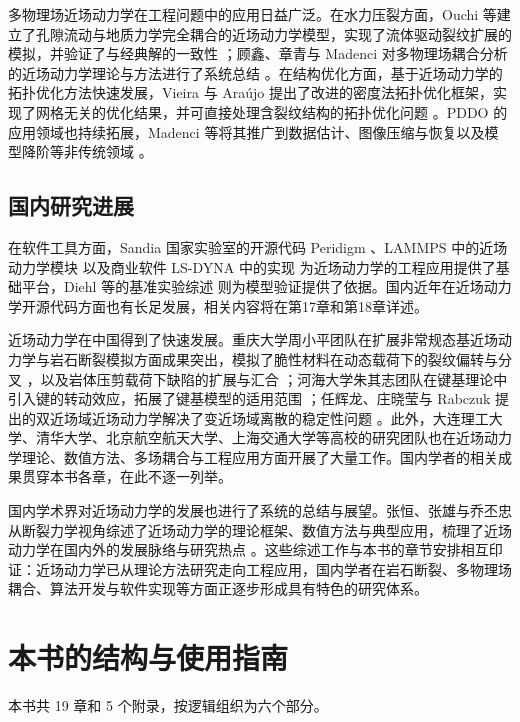 多物理场近场动力学在工程问题中的应用日益广泛。在水力压裂方面，Ouchi 等建立了孔隙流动与地质力学完全耦合的近场动力学模型，实现了流体驱动裂纹扩展的模拟，并验证了与经典解的一致性 \cite{Ouchi2015}；顾鑫、章青与 Madenci 对多物理场耦合分析的近场动力学理论与方法进行了系统总结 \cite{GuZhang2019}。在结构优化方面，基于近场动力学的拓扑优化方法快速发展，Vieira 与 Ara\'ujo 提出了改进的密度法拓扑优化框架，实现了网格无关的优化结果，并可直接处理含裂纹结构的拓扑优化问题 \cite{Vieira2024}。PDDO 的应用领域也持续拓展，Madenci 等将其推广到数据估计、图像压缩与恢复以及模型降阶等非传统领域 \cite{Madenci2022}。

\subsection{国内研究进展}

在软件工具方面，Sandia 国家实验室的开源代码 Peridigm \cite{Peridigm2012}、LAMMPS 中的近场动力学模块 \cite{Parks2008} 以及商业软件 LS-DYNA 中的实现 \cite{WuRen2015} 为近场动力学的工程应用提供了基础平台，Diehl 等的基准实验综述 \cite{Diehl2019} 则为模型验证提供了依据。国内近年在近场动力学开源代码方面也有长足发展，相关内容将在第17章和第18章详述。

近场动力学在中国得到了快速发展。重庆大学周小平团队在扩展非常规态基近场动力学与岩石断裂模拟方面成果突出，模拟了脆性材料在动态载荷下的裂纹偏转与分叉 \cite{ZhouWang2016}，以及岩体压剪载荷下缺陷的扩展与汇合 \cite{WangZhou2016}；河海大学朱其志团队在键基理论中引入键的转动效应，拓展了键基模型的适用范围 \cite{ZhuNi2017}；任辉龙、庄晓莹与 Rabczuk 提出的双近场域近场动力学解决了变近场域离散的稳定性问题 \cite{Ren2017dualhorizon}。此外，大连理工大学、清华大学、北京航空航天大学、上海交通大学等高校的研究团队也在近场动力学理论、数值方法、多场耦合与工程应用方面开展了大量工作。国内学者的相关成果贯穿本书各章，在此不逐一列举。

国内学术界对近场动力学的发展也进行了系统的总结与展望。张恒、张雄与乔丕忠从断裂力学视角综述了近场动力学的理论框架、数值方法与典型应用，梳理了近场动力学在国内外的发展脉络与研究热点 \cite{ZhangHeng2022}。这些综述工作与本书的章节安排相互印证：近场动力学已从理论方法研究走向工程应用，国内学者在岩石断裂、多物理场耦合、算法开发与软件实现等方面正逐步形成具有特色的研究体系。

\section{本书的结构与使用指南}

本书共 19 章和 5 个附录，按逻辑组织为六个部分。

